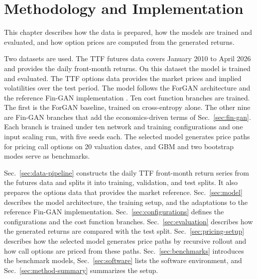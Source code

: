 \section{Methodology and Implementation}\label{sec:methodology}

This chapter describes how the data is prepared, how the models are trained and evaluated, and how option prices are computed from the generated returns. 

Two datasets are used. The TTF futures data covers January 2010 to April 2026 and provides the daily front-month returns. On this dataset the model is trained and evaluated. The TTF options data provides the market prices and implied volatilities over the test period. The model follows the ForGAN architecture and the reference Fin-GAN implementation \parencite{vuleticFinGANForecastingClassifying2024}. Ten cost function branches are trained. The first is the ForGAN baseline, trained on cross-entropy alone. The other nine are Fin-GAN branches that add the economics-driven terms of Sec.~\ref{sec:fin-gan}. Each branch is trained under ten network and training configurations and one input scaling run, with five seeds each. The selected model generates price paths for pricing call options on \num{20} valuation dates, and GBM and two bootstrap modes serve as benchmarks.

Sec.~\ref{sec:data-pipeline} constructs the daily TTF front-month return series from the futures data and splits it into training, validation, and test splits. It also prepares the options data that provides the market reference. Sec.~\ref{sec:model} describes the model architecture, the training setup, and the adaptations to the reference Fin-GAN implementation. Sec.~\ref{sec:configurations} defines the configurations and the cost function branches. Sec.~\ref{sec:evaluation} describes how the generated returns are compared with the test split. Sec.~\ref{sec:pricing-setup} describes how the selected model generates price paths by recursive rollout and how call options are priced from these paths. Sec.~\ref{sec:benchmarks} introduces the benchmark models, Sec.~\ref{sec:software} lists the software environment, and Sec.~\ref{sec:method-summary} summarizes the setup.













